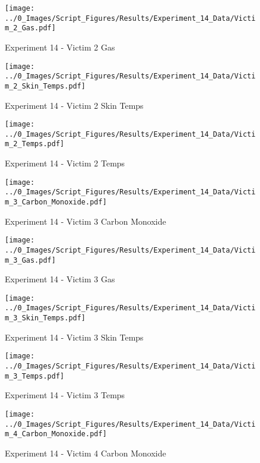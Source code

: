 	\begin{figure}[H]
		\centering
		\texttt{[image: ../0\_Images/Script\_Figures/Results/Experiment\_14\_Data/Victim\_2\_Gas.pdf]}
		\caption[]{Experiment 14 - Victim 2 Gas}
	\end{figure}
 
	\clearpage

	\begin{figure}[H]
		\centering
		\texttt{[image: ../0\_Images/Script\_Figures/Results/Experiment\_14\_Data/Victim\_2\_Skin\_Temps.pdf]}
		\caption[]{Experiment 14 - Victim 2 Skin Temps}
	\end{figure}
 

	\begin{figure}[H]
		\centering
		\texttt{[image: ../0\_Images/Script\_Figures/Results/Experiment\_14\_Data/Victim\_2\_Temps.pdf]}
		\caption[]{Experiment 14 - Victim 2 Temps}
	\end{figure}
 
	\clearpage

	\begin{figure}[H]
		\centering
		\texttt{[image: ../0\_Images/Script\_Figures/Results/Experiment\_14\_Data/Victim\_3\_Carbon\_Monoxide.pdf]}
		\caption[]{Experiment 14 - Victim 3 Carbon Monoxide}
	\end{figure}
 

	\begin{figure}[H]
		\centering
		\texttt{[image: ../0\_Images/Script\_Figures/Results/Experiment\_14\_Data/Victim\_3\_Gas.pdf]}
		\caption[]{Experiment 14 - Victim 3 Gas}
	\end{figure}
 
	\clearpage

	\begin{figure}[H]
		\centering
		\texttt{[image: ../0\_Images/Script\_Figures/Results/Experiment\_14\_Data/Victim\_3\_Skin\_Temps.pdf]}
		\caption[]{Experiment 14 - Victim 3 Skin Temps}
	\end{figure}
 

	\begin{figure}[H]
		\centering
		\texttt{[image: ../0\_Images/Script\_Figures/Results/Experiment\_14\_Data/Victim\_3\_Temps.pdf]}
		\caption[]{Experiment 14 - Victim 3 Temps}
	\end{figure}
 
	\clearpage

	\begin{figure}[H]
		\centering
		\texttt{[image: ../0\_Images/Script\_Figures/Results/Experiment\_14\_Data/Victim\_4\_Carbon\_Monoxide.pdf]}
		\caption[]{Experiment 14 - Victim 4 Carbon Monoxide}
	\end{figure}
 

